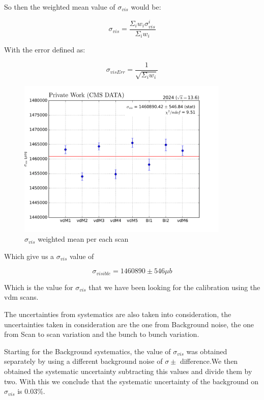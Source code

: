 So then the weighted mean value of $\sigma_{vis}$ would be:

\begin{equation}
\sigma_{vis} = \frac {\Sigma_{i} w_{i} \sigma^{i}_{vis}}{\Sigma_{i} w_{i}} 
\end{equation}

With the error defined as:

\begin{equation}
\sigma_{visErr} = \frac{1}{\sqrt{\Sigma_{i} w_{i}}}
\end{equation}

\begin{figure}[H]
    \centering
    \includegraphics[width=0.9\textwidth]{sigscan2.png}
    \caption{$\sigma_{vis}$ weighted mean per each scan}
    \label{fig:sigscan}
\end{figure}

Which give us a $\sigma_{vis}$ value of 

\begin{equation}
\sigma_{visible} = 1460890 \pm 546 \mu b
\end{equation}

Which is the value for $\sigma_{vis}$ that we have been looking for the calibration using the vdm scans.

The uncertainties from systematics are also taken into consideration, the uncertainties taken in consideration are the one from Background noise, the one from Scan to scan variation and the bunch to bunch variation.

Starting for the Background systematics, the value of $\sigma_{vis}$ was obtained separately by using a different background noise of $\sigma \pm$ difference.We then obtained the systematic uncertainty subtracting this values and divide them by two. With this we conclude that the systematic uncertainty of the background on $\sigma_{vis}$ is 0.03\%.

